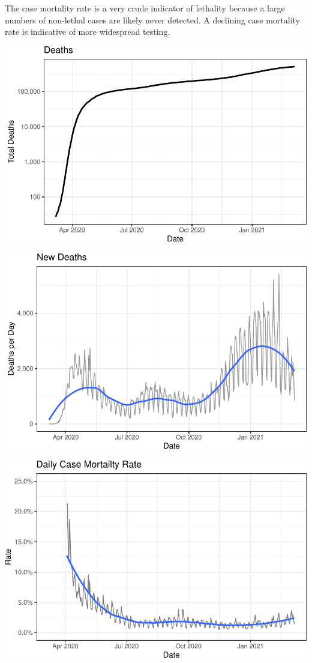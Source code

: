 \documentclass[]{article}
\begin{document}
The case mortality rate is a very crude indicator of lethality because a
large numbers of non-lethal cases are likely never detected. A declining
case mortality rate is indicative of more widespread testing.

\includegraphics{covid_files/figure-latex/unnamed-chunk-9-1.pdf}

\includegraphics{covid_files/figure-latex/unnamed-chunk-10-1.pdf}

\includegraphics{covid_files/figure-latex/unnamed-chunk-11-1.pdf}
\end{document}
